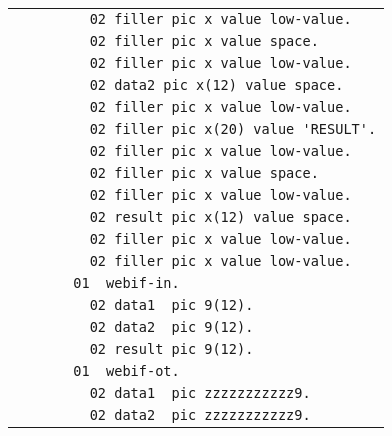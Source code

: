 {\begin{tabular}{|l|}
\vspace{-0.4em}\verb!         02 filler pic x value low-value.!\\
\vspace{-0.4em}\verb!         02 filler pic x value space.!\\
\vspace{-0.4em}\verb!         02 filler pic x value low-value.!\\
\vspace{-0.4em}\verb!         02 data2 pic x(12) value space.!\\
\vspace{-0.4em}\verb!         02 filler pic x value low-value.!\\
\vspace{-0.4em}\verb!         02 filler pic x(20) value 'RESULT'.!\\
\vspace{-0.4em}\verb!         02 filler pic x value low-value.!\\
\vspace{-0.4em}\verb!         02 filler pic x value space.!\\
\vspace{-0.4em}\verb!         02 filler pic x value low-value.!\\
\vspace{-0.4em}\verb!         02 result pic x(12) value space.!\\
\vspace{-0.4em}\verb!         02 filler pic x value low-value.!\\
\vspace{-0.4em}\verb!         02 filler pic x value low-value.!\\
\vspace{-0.4em}\verb!       01  webif-in.!\\
\vspace{-0.4em}\verb!         02 data1  pic 9(12).!\\
\vspace{-0.4em}\verb!         02 data2  pic 9(12).!\\
\vspace{-0.4em}\verb!         02 result pic 9(12).!\\
\vspace{-0.4em}\verb!       01  webif-ot.!\\
\vspace{-0.4em}\verb!         02 data1  pic zzzzzzzzzzz9.!\\
\vspace{-0.4em}\verb!         02 data2  pic zzzzzzzzzzz9.!\\

\end{tabular}}

